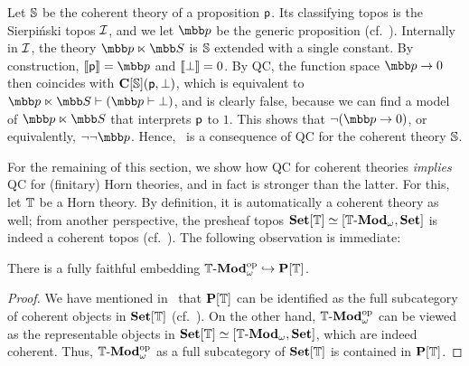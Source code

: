 \begin{example}\label{exa:qcinsierpinskitopos}
  Let $\mathbb{S}$ be the coherent theory of a proposition $\mathsf{p}$. Its classifying topos is the Sierpi\'nski topos $\mathcal{I}$, and we let $\mbb p$ be the generic proposition (cf.~). Internally in $\mathcal{I}$, the theory $\mbb p \ltimes \mbb S$ is $\mathbb{S}$ extended with a single constant. By construction, $\ass{\ms p} = \mbb p$ and $\llbracket\bot\rrbracket = 0$. By \gls{QC}, the function space $\mbb p \to 0$ then coincides with $\mathbf{C}[\mathbb{S}](\mathsf{p},\bot)$, which is equivalent to $\mbb p \ltimes \mbb S \vdash (\mbb p \vdash \bot)$, and is clearly false, because we can find a model of $\mbb p \ltimes \mbb S$ that interprets $\mathsf{p}$ to $1$. This shows that $\neg(\mbb p \to 0)$, or equivalently, $\neg\neg\mbb p$. Hence,~ is a consequence of \gls{QC} for the coherent theory $\mathbb{S}$.
\end{example}

For the remaining of this section, we show how \gls{QC} for coherent theories \emph{implies} \gls{QC} for (finitary) Horn theories, and in fact is stronger than the latter. For this, let $\mathbb{T}$ be a Horn theory. By definition, it is automatically a coherent theory as well; from another perspective, the presheaf topos $\mathbf{Set}[\mathbb{T}] \simeq [\mathbb{T}\text{-}\mathbf{Mod}_\omega,\mathbf{Set}]$ is indeed a coherent topos (cf.~\citet[D3.3.1]{johnstone2002sketches}). The following observation is immediate:

\begin{lemma}\label{lem:freepretoposfullyfaithful}
  There is a fully faithful embedding $\mathbb{T}\text{-}\mathbf{Mod}_\omega^{\mathrm{op}} \hookrightarrow \mathbf{P}[\mathbb{T}]$.
\end{lemma}
\begin{proof}
  We have mentioned in~ that $\mathbf{P}[\mathbb{T}]$ can be identified as the full subcategory of coherent objects in $\mathbf{Set}[\mathbb{T}]$ (cf.~\citet[D3.3.8]{johnstone2002sketches}). On the other hand, $\mathbb{T}\text{-}\mathbf{Mod}_\omega^{\mathrm{op}}$ can be viewed as the representable objects in $\mathbf{Set}[\mathbb{T}] \simeq [\mathbb{T}\text{-}\mathbf{Mod}_\omega,\mathbf{Set}]$, which are indeed coherent. Thus, $\mathbb{T}\text{-}\mathbf{Mod}_\omega^{\mathrm{op}}$ as a full subcategory of $\mathbf{Set}[\mathbb{T}]$ is contained in $\mathbf{P}[\mathbb{T}]$.
\end{proof}

